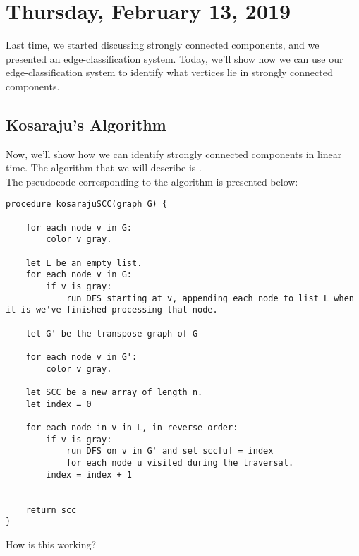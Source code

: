 \newpage

\section{Thursday, February 13, 2019}

Last time, we started discussing strongly connected components, and we presented an edge-classification system. Today, we'll show how we can use our edge-classification system to identify what vertices lie in strongly connected components.


\subsection{Kosaraju's Algorithm}

Now, we'll show how we can identify strongly connected components in linear time. The algorithm that we will describe is . \\

The pseudocode corresponding to the algorithm is presented below: 



\begin{lstlisting}
procedure kosarajuSCC(graph G) {
    
    for each node v in G: 
        color v gray.
        
    let L be an empty list.
    for each node v in G:
        if v is gray:
            run DFS starting at v, appending each node to list L when it is we've finished processing that node.
    
    let G' be the transpose graph of G
    
    for each node v in G':
        color v gray.
        
    let SCC be a new array of length n.
    let index = 0
    
    for each node in v in L, in reverse order:
        if v is gray:
            run DFS on v in G' and set scc[u] = index
            for each node u visited during the traversal.
        index = index + 1
    
    
    return scc
}
\end{lstlisting}


How is this working?

